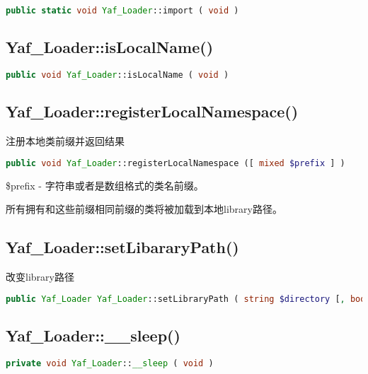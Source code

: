 \begin{lstlisting}[language=PHP]
public static void Yaf_Loader::import ( void )
\end{lstlisting}


\subsection{Yaf\_Loader::isLocalName()}

\begin{lstlisting}[language=PHP]
public void Yaf_Loader::isLocalName ( void )
\end{lstlisting}


\subsection{Yaf\_Loader::registerLocalNamespace()}

注册本地类前缀并返回结果

\begin{lstlisting}[language=PHP]
public void Yaf_Loader::registerLocalNamespace ([ mixed $prefix ] )
\end{lstlisting}

\begin{compactitem}
\item \$prefix - 字符串或者是数组格式的类名前缀。

所有拥有和这些前缀相同前缀的类将被加载到本地library路径。

\end{compactitem}


\subsection{Yaf\_Loader::setLibararyPath()}

改变library路径

\begin{lstlisting}[language=PHP]
public Yaf_Loader Yaf_Loader::setLibraryPath ( string $directory [, bool $is_global = false ] )
\end{lstlisting}

\subsection{Yaf\_Loader::\_\_sleep()}

\begin{lstlisting}[language=PHP]
private void Yaf_Loader::__sleep ( void )
\end{lstlisting}

